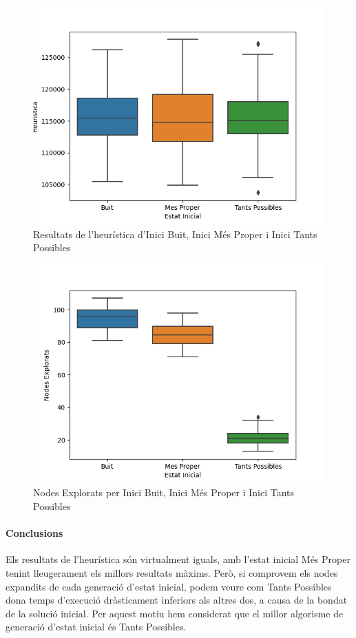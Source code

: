 \documentclass[a4paper]{article}
\begin{document}
\begin{figure}[htp]
\centering
\includegraphics[scale=0.75]{images/experiment2-1.png}
\caption{Resultats de l'heurística d'Inici Buit, Inici Més Proper i Inici Tants Possibles}
\centering
\end{figure}

\begin{figure}[htp]
\centering
\includegraphics[scale=0.75]{images/experiment2-2.png}
\caption{Nodes Explorats per Inici Buit, Inici Més Proper i Inici Tants Possibles}
\centering
\end{figure}

\newpage
\paragraph{Conclusions} Els resultats de l'heurística són virtualment iguals, amb l'estat inicial Més Proper tenint lleugerament els millors resultats màxims. Però, si comprovem els nodes expandits de cada generació d'estat inicial, podem veure com Tants Possibles dona temps d'execució dràsticament inferiors als altres dos, a causa de la bondat de la solució inicial. Per aquest motiu hem considerat que el millor algorisme de generació d'estat inicial és Tants Possibles.\\
\newpage
\end{document}
